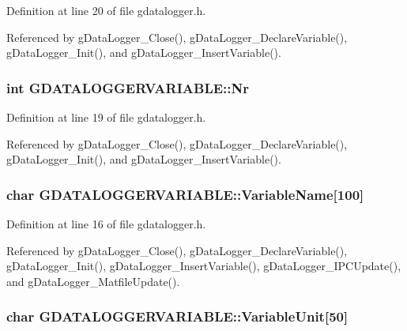 Definition at line 20 of file gdatalogger.\-h.



Referenced by g\-Data\-Logger\-\_\-\-Close(), g\-Data\-Logger\-\_\-\-Declare\-Variable(), g\-Data\-Logger\-\_\-\-Init(), and g\-Data\-Logger\-\_\-\-Insert\-Variable().

\hypertarget{structGDATALOGGERVARIABLE_a68c3eb0f57a786afe9a2658fc42b61d6}{
\subsubsection[{Nr}]{\setlength{\rightskip}{0pt plus 5cm}int G\-D\-A\-T\-A\-L\-O\-G\-G\-E\-R\-V\-A\-R\-I\-A\-B\-L\-E\-::\-Nr}}\label{structGDATALOGGERVARIABLE_a68c3eb0f57a786afe9a2658fc42b61d6}


Definition at line 19 of file gdatalogger.\-h.



Referenced by g\-Data\-Logger\-\_\-\-Close(), g\-Data\-Logger\-\_\-\-Declare\-Variable(), g\-Data\-Logger\-\_\-\-Init(), and g\-Data\-Logger\-\_\-\-Insert\-Variable().

\hypertarget{structGDATALOGGERVARIABLE_a336b7b6cbfc9cdebc7e1ade3de17ac3f}{
\subsubsection[{Variable\-Name}]{\setlength{\rightskip}{0pt plus 5cm}char G\-D\-A\-T\-A\-L\-O\-G\-G\-E\-R\-V\-A\-R\-I\-A\-B\-L\-E\-::\-Variable\-Name\mbox{[}100\mbox{]}}}\label{structGDATALOGGERVARIABLE_a336b7b6cbfc9cdebc7e1ade3de17ac3f}


Definition at line 16 of file gdatalogger.\-h.



Referenced by g\-Data\-Logger\-\_\-\-Close(), g\-Data\-Logger\-\_\-\-Declare\-Variable(), g\-Data\-Logger\-\_\-\-Init(), g\-Data\-Logger\-\_\-\-Insert\-Variable(), g\-Data\-Logger\-\_\-\-I\-P\-C\-Update(), and g\-Data\-Logger\-\_\-\-Matfile\-Update().

\hypertarget{structGDATALOGGERVARIABLE_a0d42da63f3f904774cbf2ee8d92ee135}{
\subsubsection[{Variable\-Unit}]{\setlength{\rightskip}{0pt plus 5cm}char G\-D\-A\-T\-A\-L\-O\-G\-G\-E\-R\-V\-A\-R\-I\-A\-B\-L\-E\-::\-Variable\-Unit\mbox{[}50\mbox{]}}}\label{structGDATALOGGERVARIABLE_a0d42da63f3f904774cbf2ee8d92ee135}


